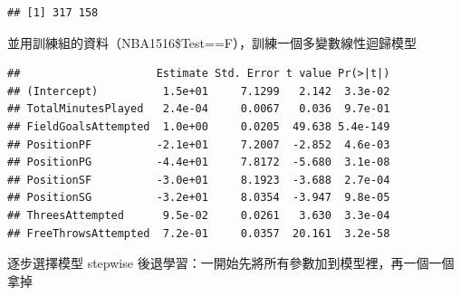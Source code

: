 \documentclass[]{book}
\newenvironment{Shaded}{\begin{snugshade}}{\end{snugshade}}
\newcommand{\CommentTok}[1]{\textcolor[rgb]{0.56,0.35,0.01}{\textit{#1}}}
\newcommand{\DataTypeTok}[1]{\textcolor[rgb]{0.13,0.29,0.53}{#1}}
\newcommand{\KeywordTok}[1]{\textcolor[rgb]{0.13,0.29,0.53}{\textbf{#1}}}
\newcommand{\NormalTok}[1]{#1}
\newcommand{\OperatorTok}[1]{\textcolor[rgb]{0.81,0.36,0.00}{\textbf{#1}}}
\newcommand{\OtherTok}[1]{\textcolor[rgb]{0.56,0.35,0.01}{#1}}
\newcommand{\StringTok}[1]{\textcolor[rgb]{0.31,0.60,0.02}{#1}}
\begin{document}
\begin{verbatim}
## [1] 317 158
\end{verbatim}

並用訓練組的資料（NBA1516\$Test==F），訓練一個多變數線性迴歸模型

\begin{Shaded}
\end{Shaded}

\begin{verbatim}
##                     Estimate Std. Error t value Pr(>|t|)
## (Intercept)          1.5e+01     7.1299   2.142  3.3e-02
## TotalMinutesPlayed   2.4e-04     0.0067   0.036  9.7e-01
## FieldGoalsAttempted  1.0e+00     0.0205  49.638 5.4e-149
## PositionPF          -2.1e+01     7.2007  -2.852  4.6e-03
## PositionPG          -4.4e+01     7.8172  -5.680  3.1e-08
## PositionSF          -3.0e+01     8.1923  -3.688  2.7e-04
## PositionSG          -3.2e+01     8.0354  -3.947  9.8e-05
## ThreesAttempted      9.5e-02     0.0261   3.630  3.3e-04
## FreeThrowsAttempted  7.2e-01     0.0357  20.161  3.2e-58
\end{verbatim}

逐步選擇模型 stepwise 後退學習：一開始先將所有參數加到模型裡，再一個一個拿掉

\begin{Shaded}
\end{Shaded}
\end{document}
